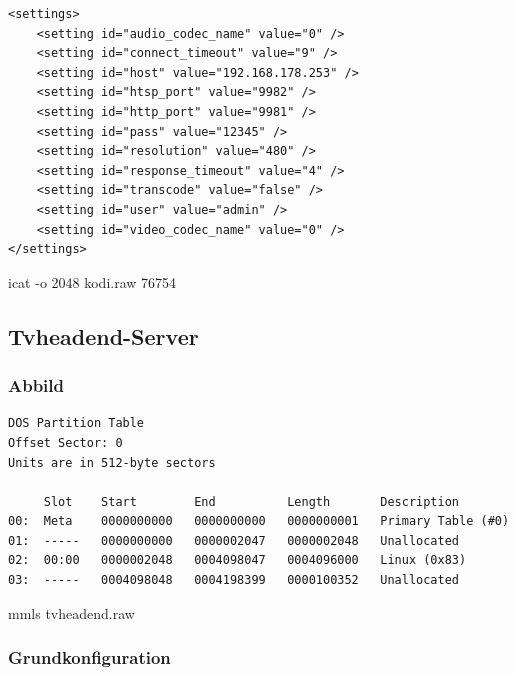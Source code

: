 \begin{cmd}[H]
\begin{verbatim}
<settings>
    <setting id="audio_codec_name" value="0" />
    <setting id="connect_timeout" value="9" />
    <setting id="host" value="192.168.178.253" />
    <setting id="htsp_port" value="9982" />
    <setting id="http_port" value="9981" />
    <setting id="pass" value="12345" />
    <setting id="resolution" value="480" />
    <setting id="response_timeout" value="4" />
    <setting id="transcode" value="false" />
    <setting id="user" value="admin" />
    <setting id="video_codec_name" value="0" />
</settings>
\end{verbatim}
\caption{icat -o 2048 kodi.raw 76754}
\label{cmd:kodi-tvheadend}
\end{cmd}

\subsection{Tvheadend-Server}

\subsubsection{Abbild}

\begin{cmd}[H]
\begin{verbatim}
DOS Partition Table
Offset Sector: 0
Units are in 512-byte sectors

     Slot    Start        End          Length       Description
00:  Meta    0000000000   0000000000   0000000001   Primary Table (#0)
01:  -----   0000000000   0000002047   0000002048   Unallocated
02:  00:00   0000002048   0004098047   0004096000   Linux (0x83)
03:  -----   0004098048   0004198399   0000100352   Unallocated
\end{verbatim}
\caption{mmls tvheadend.raw}
\label{cmd:tvheadend-mmls}
\end{cmd}

\subsubsection{Grundkonfiguration}

